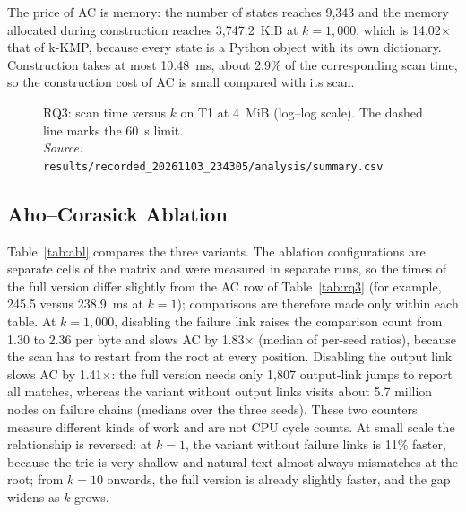 \documentclass[conference]{IEEEtran}
\newcommand{\src}[1]{{\normalfont\footnotesize\emph{Source:}~\cite{data} {\scriptsize\texttt{#1}}}}
\newcommand{\RM}{results/recorded\_20261103\_234305}
\begin{document}
The price of AC is memory: the number of states reaches 9{,}343 and the memory allocated during construction reaches 3{,}747.2~KiB at $k=1{,}000$, which is 14.02$\times$ that of k-KMP, because every state is a Python object with its own dictionary. Construction takes at most 10.48~ms, about 2.9\% of the corresponding scan time, so the construction cost of AC is small compared with its scan.

\begin{figure}[t]
\centering
{}
\caption{RQ3: scan time versus $k$ on T1 at 4~MiB (log--log scale). The dashed line marks the 60~s limit.\\ \src{\RM/analysis/summary.csv}}
\label{fig:rq3}
\end{figure}

\subsection{Aho--Corasick Ablation}
Table~\ref{tab:abl} compares the three variants. The ablation configurations are separate cells of the matrix and were measured in separate runs, so the times of the full version differ slightly from the AC row of Table~\ref{tab:rq3} (for example, 245.5 versus 238.9~ms at $k=1$); comparisons are therefore made only within each table. At $k=1{,}000$, disabling the failure link raises the comparison count from 1.30 to 2.36 per byte and slows AC by 1.83$\times$ (median of per-seed ratios), because the scan has to restart from the root at every position. Disabling the output link slows AC by 1.41$\times$: the full version needs only 1{,}807 output-link jumps to report all matches, whereas the variant without output links visits about 5.7 million nodes on failure chains (medians over the three seeds). These two counters measure different kinds of work and are not CPU cycle counts. At small scale the relationship is reversed: at $k=1$, the variant without failure links is 11\% faster, because the trie is very shallow and natural text almost always mismatches at the root; from $k=10$ onwards, the full version is already slightly faster, and the gap widens as $k$ grows.
\end{document}
